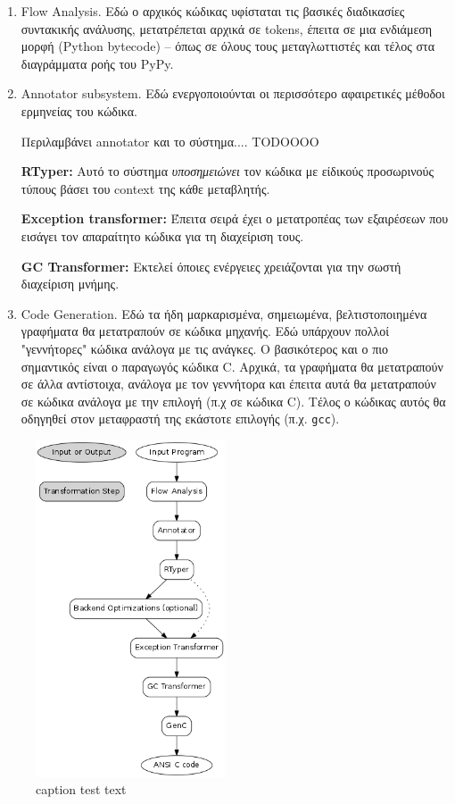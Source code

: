 \begin{enumerate}

\item Flow Analysis. Εδώ ο αρχικός κώδικας υφίσταται τις βασικές διαδικασίες
συντακικής ανάλυσης, μετατρέπεται αρχικά σε tokens, έπειτα σε μια ενδιάμεση
μορφή (Python bytecode) – όπως σε όλους τους μεταγλωττιστές και τέλος στα
διαγράμματα ροής του PyPy.

\item Annotator subsystem. Εδώ ενεργοποιούνται οι περισσότερο αφαιρετικές
μέθοδοι ερμηνείας του κώδικα.

Περιλαμβάνει annotator και το σύστημα.... TODOOOO

\textbf{RTyper:} Αυτό το σύστημα \textit{υποσημειώνει} τον κώδικα με είδικούς
προσωρινούς τύπους βάσει του context της κάθε μεταβλητής.

\textbf{Exception transformer:} Έπειτα σειρά έχει ο μετατροπέας των
εξαιρέσεων που εισάγει τον απαραίτητο κώδικα για τη
διαχείριση τους.

\textbf{GC Transformer:} Εκτελεί όποιες ενέργειες χρειάζονται για την σωστή
διαχείριση μνήμης.

\item Code Generation. Εδώ τα ήδη μαρκαρισμένα, σημειωμένα, βελτιστοποιημένα
γραφήματα θα μετατραπούν σε κώδικα μηχανής. Εδώ υπάρχουν πολλοί "γεννήτορες"
κώδικα ανάλογα με τις ανάγκες. Ο βασικότερος και ο πιο σημαντικός είναι ο
παραγωγός κώδικα C. Αρχικά, τα γραφήματα θα μετατραπούν σε άλλα αντίστοιχα,
ανάλογα με τον γεννήτορα και έπειτα αυτά θα μετατραπούν σε κώδικα ανάλογα με την
επιλογή (π.χ σε κώδικα C). Τέλος ο κώδικας αυτός θα οδηγηθεί στον μεταφραστή της
εκάστοτε επιλογής (π.χ. \texttt{gcc}).

\end{enumerate}

\begin{figure}[h]
\centering
\includegraphics[width=0.5\textwidth]{diagram.png}
\caption{caption test text}
\label{diagram one}
\end{figure}


